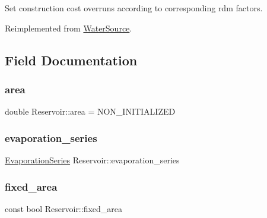 Set construction cost overruns according to corresponding rdm factors. 

Reimplemented from \mbox{\hyperlink{classWaterSource_af72660e62fda45b6ae53da5f0afd86db_af72660e62fda45b6ae53da5f0afd86db}{Water\+Source}}.



\subsection{Field Documentation}
\mbox{\label{classReservoir_a57ab55e0dde9e29a4ff97de98b09e458_a57ab55e0dde9e29a4ff97de98b09e458}} 
\subsubsection{\texorpdfstring{area}{area}}
{\footnotesize\ttfamily double Reservoir\+::area = N\+O\+N\+\_\+\+I\+N\+I\+T\+I\+A\+L\+I\+Z\+ED\hspace{0.3cm}{\ttfamily [protected]}}

\mbox{\label{classReservoir_a2d2d9b302c13703309bb798d24136810_a2d2d9b302c13703309bb798d24136810}} 
\subsubsection{\texorpdfstring{evaporation\+\_\+series}{evaporation\_series}}
{\footnotesize\ttfamily \mbox{\hyperlink{classEvaporationSeries}{Evaporation\+Series}} Reservoir\+::evaporation\+\_\+series}

\mbox{\label{classReservoir_ad4b37aef4873071d1766baaccce5b8cf_ad4b37aef4873071d1766baaccce5b8cf}} 
\subsubsection{\texorpdfstring{fixed\+\_\+area}{fixed\_area}}
{\footnotesize\ttfamily const bool Reservoir\+::fixed\+\_\+area}

